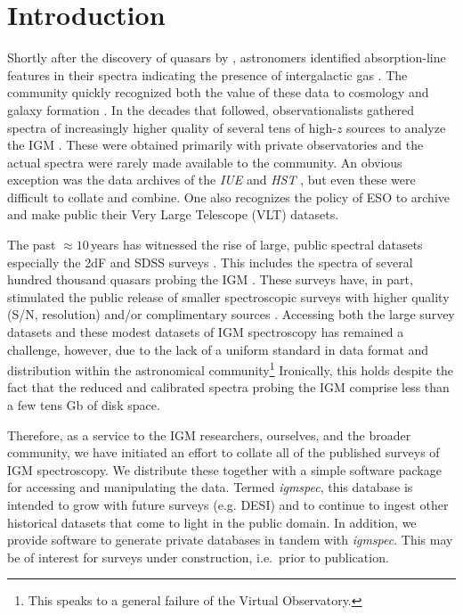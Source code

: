 \documentclass[12pt,preprint]{aastex}
\begin{document}
\section{Introduction}
\label{sec:intro}

Shortly after the discovery of quasars by \cite{schmidt6X},
astronomers identified absorption-line features in their 
spectra indicating the presence of intergalactic gas
\citep{burbidge,bahcall}.  
The community quickly recognized both the value of these
data to cosmology and galaxy formation \cite{bahcall,spitzer}.
In the decades that followed, observationalists gathered
spectra of increasingly higher quality of several tens of
high-$z$ sources to analyze the IGM 
\citep{sargent,young,tytler,wolfe,lanzetta,bergeron}.
These were obtained primarily with private observatories and
the actual spectra were rarely made available
to the community.
An obvious exception was the data archives of the
{\it IUE} and {\it HST}  \citep{jannuzi,bechtold},
but even these were difficult to 
collate and combine.
One also recognizes the policy of ESO to archive and
make public their Very Large Telescope (VLT) datasets.

The past $\approx 10$\,years has witnessed the
rise of large, public spectral datasets especially
the 2dF and SDSS surveys \citep{york,2dF}.
This includes the spectra of several hundred thousand quasars
probing the IGM \citep{sdss_dr7Q,boss_dr12Q}.
These surveys have, in part, stimulated the public release
of smaller spectroscopic surveys with higher quality
(S/N, resolution) and/or complimentary sources
\citep[e.g.][]{pro07,hdlls}.
Accessing both the large survey datasets 
and these modest datasets of IGM spectroscopy
has remained a challenge, however, due to the lack of a
uniform standard in data format and distribution within the astronomical
community\footnote{This speaks to a general failure of the
Virtual Observatory.}
Ironically, this holds despite the fact that the reduced and calibrated
spectra probing the IGM comprise less than a few
tens Gb of disk space.

Therefore, as a service to the IGM researchers, ourselves, and the
broader community, we have initiated an effort to collate 
all of the published surveys of IGM spectroscopy. We distribute
these together with a simple software package
for accessing and manipulating the data.  
Termed {\it igmspec}, this database
is intended to grow with future surveys (e.g. DESI)
and to continue to ingest other historical 
datasets that come to light in
the public domain.  In addition, we provide 
software to generate private databases in tandem
with {\it igmspec}.  This may be of interest for surveys 
under construction, i.e.\ prior to publication.
\end{document}
